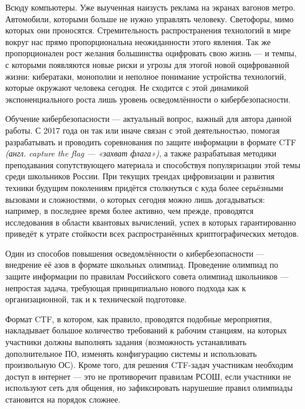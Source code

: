 \Introduction

Всюду компьютеры. Уже выученная наизусть реклама на экранах вагонов метро. Автомобили, которыми больше не нужно управлять человеку. Светофоры, мимо которых они проносятся. Стремительность распространения технологий в мире вокруг нас прямо пропорциональна неожиданности этого явления\cite{DigitalizatonTempo}. Так же пропорционален рост желания большинства\cite{DigitalizationTempo2} оцифровать свою жизнь --- и темпы, с которыми появляются новые риски и угрозы для этогой новой оцифрованной жизни: кибератаки, монополии и неполное понимание устройства технологий, которые окружают человека сегодня. Не сходится с этой динамикой экспоненциального роста лишь уровень осведомлённости о кибербезопасности.

Обучение кибербезопасности --- актуальный вопрос, важный для автора данной работы. С 2017 года он так или иначе связан с этой деятельностью, помогая разрабатывать и проводить соревнования по защите информации в формате CTF \textit{(англ. capture the flag --- «захват флага»)}, а также разрабатывая методики преподавания сопутствующего материала\cite{NTISchool} и способствуя популяризации этой темы среди школьников России. При текущих трендах цифровизации и развития техники будущим поколениям придётся столкнуться с куда более серьёзными вызовами и сложностями, о которых сегодня можно лишь догадываться: например, в последнее время более активно, чем прежде, проводятся исследования в области квантовых вычислений\cite{Quantum1}\cite{Quantum2}, успех в которых гарантированно приведёт к утрате стойкости всех распространённых криптографических методов\cite{Quantum3}.

Один из способов повышения осведомлённости о кибербезопасности --- внедрение её азов в формате школьных олимпиад. Проведение олимпиад по защите информации по правилам Российского совета олимпиад школьников --- непростая задача, требующая принципиально нового подхода как к организационной, так и к технической подготовке.

Формат CTF, в котором, как правило, проводятся подобные мероприятия, накладывает большое количество требований к рабочим станциям, на которых участники должны выполнять задания (возможность устанавливать дополнительное ПО, изменять конфигурацию системы и использовать произвольную ОС). Кроме того, для решения CTF-задач участникам необходим доступ в интернет --- это не противоречит правилам РСОШ, если участники не используют сеть для общения, но зафиксировать нарушешие правил олимпиады становится на порядок сложнее.


